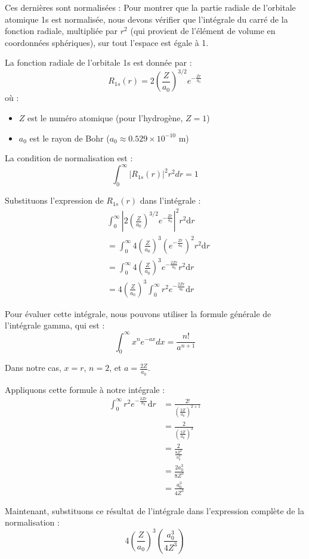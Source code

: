 \documentclass[french]{yLectureNote}
\newcommand{\dd}{\mathrm{d}}
\begin{document}
Ces dernières sont normalisées :
Pour montrer que la partie radiale de l'orbitale atomique 1s est normalisée, nous devons vérifier que l'intégrale du carré de la fonction radiale, multipliée par $r^2$ (qui provient de l'élément de volume en coordonnées sphériques), sur tout l'espace est égale à 1.

La fonction radiale de l'orbitale 1s est donnée par :
\[ R_{1s}(r) = 2 \left(\frac{Z}{a_0}\right)^{3/2} e^{-\frac{Zr}{a_0}} \]
où :
\begin{itemize}
    \item $Z$ est le numéro atomique (pour l'hydrogène, $Z=1$)
    \item $a_0$ est le rayon de Bohr ($a_0 \approx 0.529 \times 10^{-10}$ m)
\end{itemize}

La condition de normalisation est :
\[ \int_0^\infty |R_{1s}(r)|^2 r^2 dr = 1 \]

Substituons l'expression de $R_{1s}(r)$ dans l'intégrale :
\begin{align*}
    &\int_0^\infty \left|2 \left(\frac{Z}{a_0}\right)^{3/2} e^{-\frac{Zr}{a_0}}\right|^2 r^2 \dd r \\
    &= \int_0^\infty 4 \left(\frac{Z}{a_0}\right)^3 \left(e^{-\frac{Zr}{a_0}}\right)^2 r^2 \dd r \\
    &= \int_0^\infty 4 \left(\frac{Z}{a_0}\right)^3 e^{-\frac{2Zr}{a_0}} r^2 \dd r\\
    &= 4 \left(\frac{Z}{a_0}\right)^3 \int_0^\infty r^2 e^{-\frac{2Zr}{a_0}} \dd r
\end{align*}

Pour évaluer cette intégrale, nous pouvons utiliser la formule générale de l'intégrale gamma, qui est :
\[ \int_0^\infty x^n e^{-ax} dx = \frac{n!}{a^{n+1}} \]

Dans notre cas, $x = r$, $n = 2$, et $a = \frac{2Z}{a_0}$.

Appliquons cette formule à notre intégrale :
\begin{align*}
    \int_0^\infty r^2 e^{-\frac{2Zr}{a_0}} \dd r &= \frac{2!}{\left(\frac{2Z}{a_0}\right)^{2+1}} \\
    &= \frac{2}{\left(\frac{2Z}{a_0}\right)^3} \\
    &= \frac{2}{\frac{8Z^3}{a_0^3}} \\
    &= \frac{2a_0^3}{8Z^3} \\
    &= \frac{a_0^3}{4Z^3}
\end{align*}

Maintenant, substituons ce résultat de l'intégrale dans l'expression complète de la normalisation :
\[ 4 \left(\frac{Z}{a_0}\right)^3 \left(\frac{a_0^3}{4Z^3}\right) \]
\end{document}
